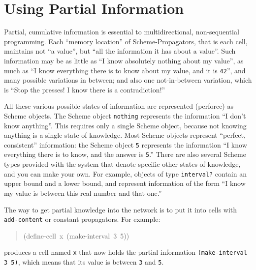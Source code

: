 \documentclass[12pt,letterpaper,english]{article}
\begin{document}
\section{Using Partial Information}
\label{using-partial-information}

Partial, cumulative information is essential to
multidirectional, non-sequential programming.  Each ``memory
location'' of Scheme-Propagators, that is each cell, maintains not ``a
value'', but ``all the information it has about a value''.  Such
information may be as little as ``I know absolutely nothing about my
value'', as much as ``I know everything there is to know about my value,
and it is \texttt{42}'', and many possible variations in between; and also
one not-in-between variation, which is ``Stop the presses!  I know
there is a contradiction!''

All these various possible states of information are represented
(perforce) as Scheme objects.  The Scheme object \texttt{nothing} represents
the information ``I don't know anything''.  This requires only a single
Scheme object, because not knowing anything is a single state of
knowledge.  Most Scheme objects represent ``perfect, consistent''
information: the Scheme object \texttt{5} represents the information ``I
know everything there is to know, and the answer is \texttt{5}.''  There are
also several Scheme types provided with the system that denote
specific other states of knowledge, and you can make your own.  For
example, objects of type \texttt{interval?} contain an upper bound and a
lower bound, and represent information of the form ``I know my value is
between this real number and that one.''

The way to get partial knowledge into the network is to put it into
cells with \texttt{add-content} or constant propagators.  For example:
\begin{quote}{\ttfamily \raggedright \noindent
(define-cell~x~(make-interval~3~5))
}\end{quote}
produces a cell named \texttt{x} that now holds the partial information
\texttt{(make-interval 3 5)}, which means that its value is
between \texttt{3} and \texttt{5}.
\end{document}
